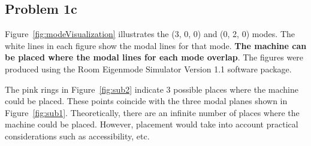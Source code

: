 {\subsection*{Problem 1c}

Figure~\ref{fig:modeVisualization} illustrates the (3, 0, 0) and (0, 2, 0) modes.  The white lines in each figure show the modal lines for that mode.  \textbf{The machine can be placed where the modal lines for each mode overlap}.  The figures were produced using the Room Eigenmode Simulator Version 1.1 software package.

\vspace{0.25cm}
The pink rings in Figure~\ref{fig:sub2} indicate 3 possible places where the machine could be placed.  These points coincide with the three modal planes shown in Figure~\ref{fig:sub1}.  Theoretically, there are an infinite number of places where the machine could be placed.  However, placement would take into account practical considerations such as accessibility, etc.


}
